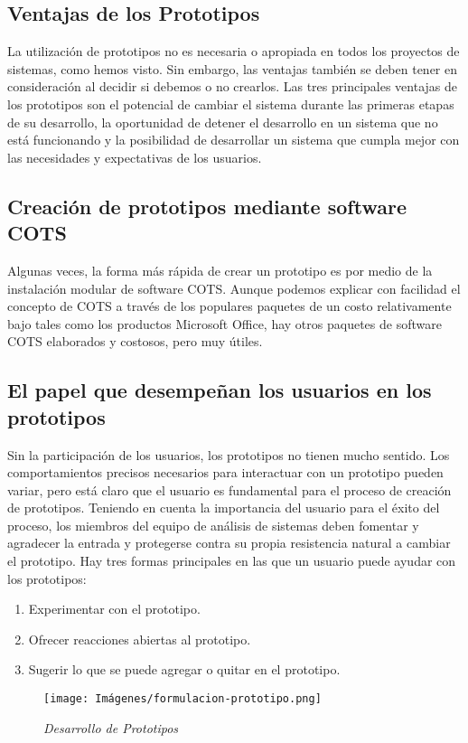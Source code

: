\subsection{Ventajas de los Prototipos }
La utilización de prototipos no es necesaria o apropiada en todos los proyectos de sistemas, como hemos visto. Sin embargo, las ventajas también se deben tener en consideración al decidir si debemos o no crearlos. Las tres principales ventajas de los prototipos son el potencial de cambiar el sistema durante las primeras etapas de su desarrollo, la oportunidad de detener el desarrollo en un sistema que no está funcionando y la posibilidad de desarrollar un sistema que cumpla mejor con las necesidades y expectativas de los usuarios. 

\subsection{Creación de prototipos mediante software COTS }
Algunas veces, la forma más rápida de crear un prototipo es por medio de la instalación modular de software COTS. Aunque podemos explicar con facilidad el concepto de COTS a través de los populares paquetes de un costo relativamente bajo tales como los productos Microsoft Office, hay otros paquetes de software COTS elaborados y costosos, pero muy útiles. 

\subsection{El papel que desempeñan los usuarios en los prototipos }
Sin la participación de los usuarios, los prototipos no tienen mucho sentido. Los comportamientos precisos necesarios para interactuar con un prototipo pueden variar, pero está claro que el usuario es fundamental para el proceso de creación de prototipos. Teniendo en cuenta la importancia del usuario para el éxito del proceso, los miembros del equipo de análisis de sistemas deben fomentar y agradecer la entrada y protegerse contra su propia resistencia natural a cambiar el prototipo. Hay tres formas principales en las que un usuario puede ayudar con los prototipos: 
\begin{enumerate}
\item Experimentar con el prototipo. 
\item Ofrecer reacciones abiertas al prototipo. 
\item Sugerir lo que se puede agregar o quitar en el prototipo.
\end{enumerate}
\begin{figure}[h!]
    \centering
    \texttt{[image: Imágenes/formulacion-prototipo.png]}
    \caption{\textit{Desarrollo de Prototipos}}
    \label{exemploLabel}
    \end{figure}
